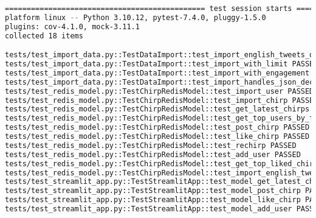 \documentclass[a4paper,11pt]{article}
\begin{document}
\begin{lstlisting}[language=bash, caption=Test execution results]
============================================== test session starts ===============================================
platform linux -- Python 3.10.12, pytest-7.4.0, pluggy-1.5.0
plugins: cov-4.1.0, mock-3.11.1
collected 18 items                                                                                              

tests/test_import_data.py::TestDataImport::test_import_english_tweets_only PASSED                         [  5%]
tests/test_import_data.py::TestDataImport::test_import_with_limit PASSED                                  [ 11%]
tests/test_import_data.py::TestDataImport::test_import_with_engagement PASSED                             [ 16%]
tests/test_import_data.py::TestDataImport::test_import_handles_json_decode_error PASSED                   [ 22%]
tests/test_redis_model.py::TestChirpRedisModel::test_import_user PASSED                                   [ 27%]
tests/test_redis_model.py::TestChirpRedisModel::test_import_chirp PASSED                                  [ 33%]
tests/test_redis_model.py::TestChirpRedisModel::test_get_latest_chirps PASSED                             [ 38%]
tests/test_redis_model.py::TestChirpRedisModel::test_get_top_users_by_followers PASSED                    [ 44%]
tests/test_redis_model.py::TestChirpRedisModel::test_post_chirp PASSED                                    [ 50%]
tests/test_redis_model.py::TestChirpRedisModel::test_like_chirp PASSED                                    [ 55%]
tests/test_redis_model.py::TestChirpRedisModel::test_rechirp PASSED                                       [ 61%]
tests/test_redis_model.py::TestChirpRedisModel::test_add_user PASSED                                      [ 66%]
tests/test_redis_model.py::TestChirpRedisModel::test_get_top_liked_chirps PASSED                          [ 72%]
tests/test_redis_model.py::TestChirpRedisModel::test_import_english_tweets_only PASSED                    [ 77%]
tests/test_streamlit_app.py::TestStreamlitApp::test_model_get_latest_chirps PASSED                        [ 83%]
tests/test_streamlit_app.py::TestStreamlitApp::test_model_post_chirp PASSED                               [ 88%]
tests/test_streamlit_app.py::TestStreamlitApp::test_model_like_chirp PASSED                               [ 94%]
tests/test_streamlit_app.py::TestStreamlitApp::test_model_add_user PASSED                                 [100%]
\end{lstlisting}
\end{document}
